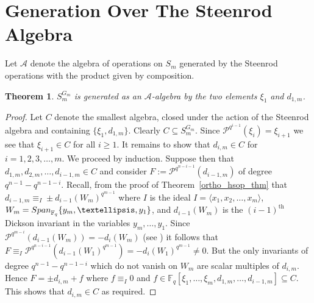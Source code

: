 \documentclass{amsart}
\newcommand{\field}{\mathbb{F}}
\newcommand{\PP}{\mathcal{P}}
\newcommand{\A}{\mathcal{A}}
\newtheorem{thm}[subsection]{Theorem}
\begin{document}
\section{Generation Over The Steenrod Algebra}

Let $\A$ denote the algebra of operations on $S_m$ generated by the Steenrod operations with the product given by composition.
\begin{thm} \label{st_alg_gen}
    $S_m^{G_m}$ is generated as an $\A$-algebra by 
    the two elements $\xi_1$ and $d_{1,m}$.
\end{thm}
\begin{proof}
    Let $C$ denote the smallest algebra, closed under the action of the
    Steenrod algebra and containing $\{\xi_1,d_{1,m}\}$.
    Clearly $C \subseteq S_m^{G_m}$.  
    Since $\PP^{q^{i-1}}(\xi_{i})=\xi_{i+1}$ we see that $\xi_{i+1} \in C$ for all $i \geq 1$.
    It remains to show that $d_{i,m} \in C$ for $i=1,2,3,\dots,m$.
    We proceed by induction.  
     Suppose then that
    $d_{1,m},d_{2,m},\dots,d_{i-1,m} \in C$ and consider $F:=\PP^{q^{n-i-1}}(d_{i-1,m})$ of degree $q^{n-1}-q^{n-1-i}$.
    Recall, from the proof of Theorem~\ref{ortho_hsop_thm} that 
    $d_{i-1,m}  \equiv_I \pm d_{i-1}(W_m)^{q^{m-1}}$
    where $I$ is the ideal 
    $I=\langle x_1,x_2,\ldots,x_m\rangle$, $W_m={\rm Span}_{\field_q}\{y_m,\ldots,y_1\}$,
    and $d_{i-1}(W_m)$ is the $(i-1)^\text{th}$ Dickson invariant in the variables
    $y_m,\ldots,y_1$. %
    Since $\PP^{q^{m-i}}(d_{i-1}(W_m)) = -d_i(W_m)$ (see 
    \cite{Wilkerson-primDickinva:83}) it follows that 
    $F \equiv_I \PP^{q^{n-i-1}}(d_{i-1}(W_1)^{q^{m-1}}) = -d_i(W_1)^{q^{m-1}} \neq 0$.
    But the only invariants of degree $q^{n-1}-q^{n-1-i}$ which do not vanish on $W_m$
    are scalar multiples of $d_{i,m}$.  Hence $F = \pm d_{i,m} + f$ where 
    $f \equiv_I 0$ and 
    $f \in \field_q[\xi_1,\ldots,\xi_{m},d_{1,m},\ldots,d_{i-1,m}] \subseteq C$.  
    This shows that $d_{i,m} \in C$ as required.
\end{proof}
\end{document}
